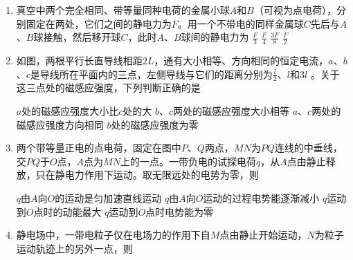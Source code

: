 

\begin{enumerate}[leftmargin=0em]
\renewcommand{\labelenumi}{\arabic{enumi}.}
\item
{}
真空中两个完全相同、带等量同种电荷的金属小球$ A $和$ B $（可视为点电荷），分别固定在两处，它们之间的静电力为$ F $。用一个不带电的同样金属球$ C $先后与$ A $、$ B $球接触，然后移开球$ C $，此时$ A $、$ B $球间的静电力为  
\fourchoices
{$ \frac{F}{3} $}
{$ \frac{F}{4} $}
{$ \frac{3F}{8} $}
{$ \frac{F}{2} $}

\item
{}
如图，两根平行长直导线相距$ 2L $，通有大小相等、方向相同的恒定电流，$ a $、$ b $、$ c $是导线所在平面内的三点，左侧导线与它们的距离分别为$ \frac{l}{2} $、$ l $和$ 3l $ 。关于这三点处的磁感应强度，下列判断正确的是  
\begin{figure}[h!]
	\centering

\end{figure}




\fourchoices
{$ a $处的磁感应强度大小比$ c $处的大}
{$ b $、$ c $两处的磁感应强度大小相等}
{$ a $、$ c $两处的磁感应强度方向相同}
{$ b $处的磁感应强度为零}


\item
{}
两个带等量正电的点电荷，固定在图中$ P $、$ Q $两点，$ MN $为$ PQ $连线的中垂线，交$ PQ $于$ O $点，$ A $点为$ MN $上的一点。一带负电的试探电荷$ q $，从$ A $点由静止释放，只在静电力作用下运动。取无限远处的电势为零，则  
\begin{figure}[h!]
	\centering
	
\end{figure}


\fourchoices
{$ q $由$ A $向$ O $的运动是匀加速直线运动 }
{$ q $由$ A $向$ O $运动的过程电势能逐渐减小}
{$ q $运动到$ O $点时的动能最大 }
{$ q $运动到$ O $点时电势能为零}

\item 
{}
静电场中，一带电粒子仅在电场力的作用下自$ M $点由静止开始运动，$ N $为粒子运动轨迹上的另外一点，则  




\end{enumerate}
